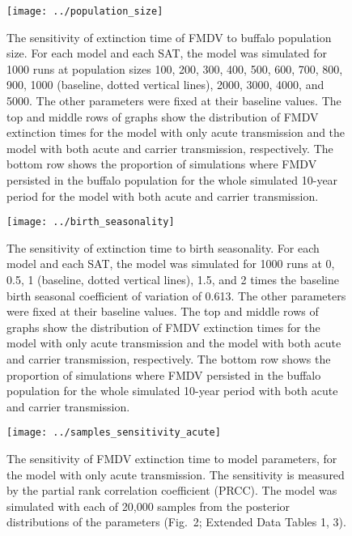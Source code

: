 \documentclass[12pt, USenglish]{article}  %
\begin{document}
\begin{figure}
  \centering
  \texttt{[image: ../population\_size]}
  \caption{The sensitivity of extinction time of FMDV to buffalo
    population size.
    For each model and each SAT, the model was simulated for 1000 runs
    at population sizes 100, 200, 300, 400, 500, 600, 700, 800, 900,
    1000 (baseline, dotted vertical lines), 2000, 3000, 4000, and
    5000.
    The other parameters were fixed at their baseline values.
    The top and middle rows of graphs show the distribution of
    FMDV extinction times for the model with only acute transmission
    and the model with both acute and carrier transmission,
    respectively.
    The bottom row shows the proportion of simulations where FMDV
    persisted in the buffalo population for the whole simulated
    10-year period for the model with both acute and carrier
    transmission.}
\end{figure}


\begin{figure}
  \centering
  \texttt{[image: ../birth\_seasonality]}
  \caption{The sensitivity of extinction time to birth seasonality.
    For each model and each SAT, the model was simulated for
    1000 runs at 0, 0.5, 1 (baseline, dotted vertical lines), 1.5, and
    2 times the baseline birth seasonal coefficient of variation of
    0.613.
    The other parameters were fixed at their baseline values.
    The top and middle rows of graphs show the distribution of
    FMDV extinction times for the model with only acute transmission
    and the model with both acute and carrier transmission,
    respectively.
    The bottom row shows the proportion of simulations where FMDV
    persisted in the buffalo population for the whole simulated
    10-year period with both acute and carrier transmission.}
\end{figure}


\begin{figure}
  \centering
  \texttt{[image: ../samples\_sensitivity\_acute]}
  \caption{The sensitivity of FMDV extinction time to model
    parameters, for the model with only acute transmission.
    The sensitivity is measured by the partial rank correlation
    coefficient (PRCC). The model was simulated with each of 20,000
    samples from the posterior distributions of the parameters
    (Fig.~2; Extended Data Tables 1, 3).}
\end{figure}
\end{document}
